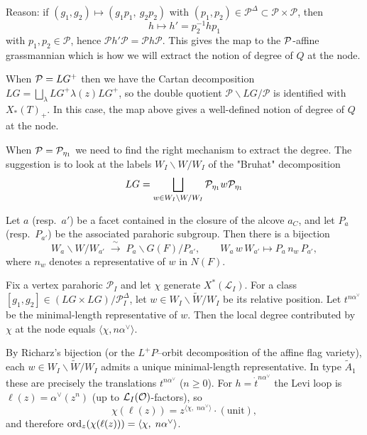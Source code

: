 \documentclass[12pt]{article}
\begin{document}
Reason: if $(g_1,g_2)\mapsto (g_1p_1,\ g_2p_2)$ with $(p_1,p_2)\in \mathcal{P}^\Delta\subset \mathcal{P}\times\mathcal{P}$, then
\[
h\mapsto h'=p_2^{-1}hp_1
\]
with $p_1,p_2\in \mathcal{P}$, hence $\mathcal{P} h' \mathcal{P}=\mathcal{P} h \mathcal{P}$. This gives the map to the ${\mathcal{P}}$-affine grassmannian which is how we will extract the notion of degree of $Q$ at the node.

When ${\mathcal{P}} = LG^+$ then we have the Cartan decomposition $LG = \bigsqcup_{\lambda} LG^+ \lambda(z) LG^+$, so the double quotient $\mathcal{P}\backslash LG/\mathcal{P}$ is identified with $X_*(T)_+$. In this case, the map above gives a well-defined notion of degree of $Q$ at the node.

When ${\mathcal{P}} = {\mathcal{P}}_{\eta_1}$ we need to find the right mechanism to extract the degree. The suggestion is to look at the labels $W_I \backslash W / W_I$ of the "Bruhat" decomposition \begin{align*}
    LG = \bigsqcup_{w\in W_I \backslash W / W_I} {\mathcal{P}}_{\eta_1} w {\mathcal{P}}_{\eta_1}
\end{align*}


\begin{theorem}
Let $a$ (resp.\ $a'$) be a facet contained in the closure of the
alcove $a_C$, and let $P_a$ (resp.\ $P_{a'}$) be the associated
parahoric subgroup. Then there is a bijection
\[
W_a\backslash W / W_{a'} \;\xrightarrow{\ \sim\ }\; P_a\backslash G(F)/P_{a'},
\qquad
W_a\, w\, W_{a'} \longmapsto P_a\, n_w\, P_{a'},
\]
where $n_w$ denotes a representative of $w$ in $N(F)$.
\end{theorem}

\begin{lemma}
Fix a vertex parahoric $\mathcal{P}_I$ and let $\chi$ generate $X^*(\mathcal{L}_I)$. For a class $[g_1,g_2]\in (LG\times LG)/\mathcal{P}_I^\Delta$, let $w\in W_I\backslash\widetilde{W}/W_I$ be its relative position. Let $t^{n\alpha^\vee}$ be the minimal-length representative of $w$. Then the local degree contributed by $\chi$ at the node equals $\langle \chi, n\alpha^\vee\rangle$.
\end{lemma}

By Richarz's bijection (or the $L^+P$--orbit decomposition of the affine
flag variety), each $w\in W_I\backslash \widetilde W/W_I$ admits a unique
minimal-length representative. In type $\widetilde A_1$ these are precisely
the translations $t^{n\alpha^\vee}$ ($n\ge 0$). For $h=\dot t^{n\alpha^\vee}$
the Levi loop is $\ell(z)=\alpha^\vee(z^n)$ (up to ${\mathcal{L}}_I({\mathcal{O}})$-factors), so
\[
\chi(\ell(z)) = z^{\langle \chi,\;n\alpha^\vee\rangle}\cdot (\text{unit}),
\]
and therefore $\operatorname{ord}_z(\chi(\ell(z)))=\langle \chi,\;n\alpha^\vee\rangle$.
\end{document}

